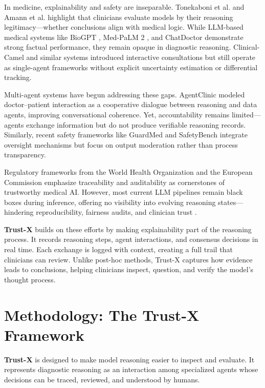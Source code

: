 \documentclass[letterpaper]{article} %
\begin{document}
In medicine, explainability and safety are inseparable. Tonekaboni et al. \cite{tonekaboni2019clinicians} and Amann et al. \cite{amann2020explainability} highlight that clinicians evaluate models by their reasoning legitimacy—whether conclusions align with medical logic. While LLM-based medical systems like BioGPT \cite{luo2022biogpt}, Med-PaLM 2 \cite{singhal2025toward}, and ChatDoctor \cite{li2023chatdoctor} demonstrate strong factual performance, they remain opaque in diagnostic reasoning. Clinical-Camel \cite{toma2023clinical} and similar systems introduced interactive consultations but still operate as single-agent frameworks without explicit uncertainty estimation or differential tracking.

Multi-agent systems have begun addressing these gaps. AgentClinic \cite{schmidgall2024agentclinic} modeled doctor–patient interaction as a cooperative dialogue between reasoning and data agents, improving conversational coherence. Yet, accountability remains limited—agents exchange information but do not produce verifiable reasoning records. Similarly, recent safety frameworks like GuardMed and SafetyBench integrate oversight mechanisms but focus on output moderation rather than process transparency.

Regulatory frameworks from the World Health Organization \cite{guidance2021ethics} and the European Commission \cite{bomhard2021regulation} emphasize traceability and auditability as cornerstones of trustworthy medical AI. However, most current LLM pipelines remain black boxes during inference, offering no visibility into evolving reasoning states—hindering reproducibility, fairness audits, and clinician trust \cite{begoli2019need,doshi2017towards}.

\textbf{Trust-X} builds on these efforts by making explainability part of the reasoning process. It records reasoning steps, agent interactions, and consensus decisions in real time. Each exchange is logged with context, creating a full trail that clinicians can review. Unlike post-hoc methods, Trust-X captures how evidence leads to conclusions, helping clinicians inspect, question, and verify the model’s thought process.

\section{Methodology: The Trust-X Framework}
\textbf{Trust-X} is designed to make model reasoning easier to inspect and evaluate. 
It represents diagnostic reasoning as an interaction among specialized agents whose decisions can be traced, reviewed, and understood by humans.
\end{document}
